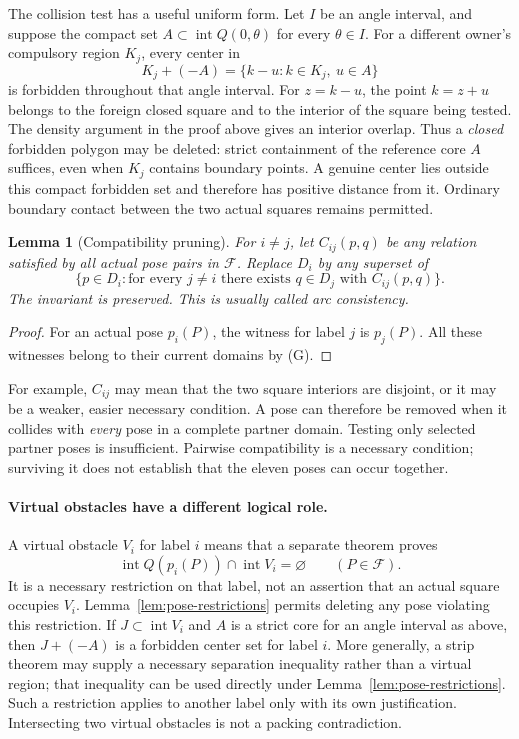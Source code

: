 \documentclass[11pt]{article}
\newtheorem{lemma}[theorem]{Lemma}
\begin{document}
The collision test has a useful uniform form.  Let $I$ be an angle interval,
and suppose the compact set $A\subset\operatorname{int}Q(0,\theta)$ for
every $\theta\in I$.
For a different owner's compulsory region $K_j$, every center in
\[
 K_j+(-A)=\{k-u:k\in K_j,\ u\in A\}
\]
is forbidden throughout that angle interval.  For $z=k-u$, the point
$k=z+u$ belongs to the foreign closed square and to the interior of the
square being tested.  The density argument in the proof above gives an
interior overlap.  Thus a \emph{closed} forbidden polygon may be deleted:
strict containment of the reference core $A$ suffices, even when $K_j$
contains boundary points.  A genuine center lies outside this compact
forbidden set and therefore has positive distance from it.  Ordinary
boundary contact between the two actual squares remains permitted.

\begin{lemma}[Compatibility pruning]\label{lem:arc-consistency}
For $i\ne j$, let $C_{ij}(p,q)$ be any relation satisfied by all actual
pose pairs in $\mathcal F$.  Replace $D_i$ by any superset of
\[
 \{p\in D_i:\text{for every }j\ne i\text{ there exists }q\in D_j
                   \text{ with }C_{ij}(p,q)\}.
\]
The invariant is preserved.  This is usually called arc consistency.
\end{lemma}

\begin{proof}
For an actual pose $p_i(P)$, the witness for label $j$ is $p_j(P)$.
All these witnesses belong to their current domains by (G).
\end{proof}

For example, $C_{ij}$ may mean that the two square interiors are disjoint,
or it may be a weaker, easier necessary condition.  A pose can therefore
be removed when it collides with \emph{every} pose in a complete partner
domain.  Testing only selected partner poses is insufficient.  Pairwise
compatibility is a necessary condition; surviving it does not establish
that the eleven poses can occur together.

\paragraph{Virtual obstacles have a different logical role.}
A virtual obstacle $V_i$ for label $i$ means that a separate theorem proves
\[
 \operatorname{int}Q(p_i(P))\cap\operatorname{int}V_i=\varnothing
 \qquad(P\in\mathcal F).
\]
It is a necessary restriction on that label, not an assertion that an
actual square occupies $V_i$.  Lemma~\ref{lem:pose-restrictions} permits deleting any pose violating
this restriction.  If $J\subset\operatorname{int}V_i$ and $A$ is a strict
core for an angle interval as above, then $J+(-A)$ is a forbidden center
set for label $i$.
More generally, a strip theorem may supply a necessary separation
inequality rather than a virtual region; that inequality can be used
directly under Lemma~\ref{lem:pose-restrictions}.
Such a restriction applies to another label only with its own justification.
Intersecting two virtual obstacles is not a packing contradiction.
\end{document}
